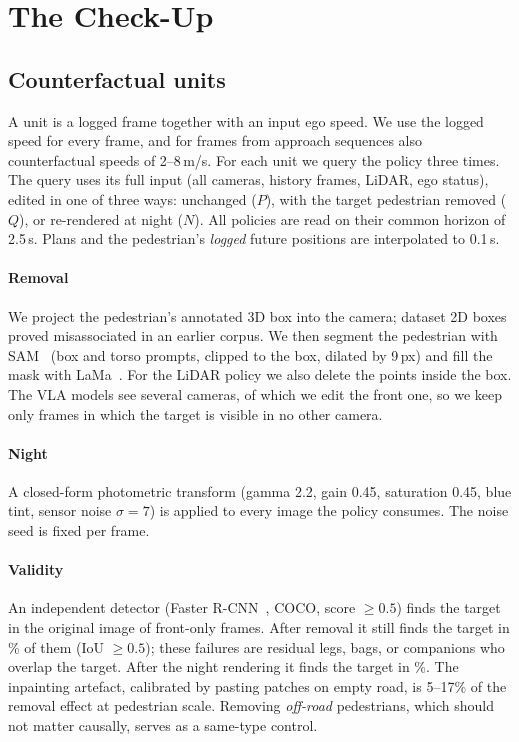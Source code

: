\section{The Check-Up}
\label{sec:checkup}



\subsection{Counterfactual units}
A unit is a logged frame together with an input ego speed. We use the logged speed for every frame,
and for frames from approach sequences also counterfactual speeds of 2--8\,m/s. For each unit we query
the policy three times. The query uses its full input (all cameras, history frames, LiDAR, ego
status), edited in one of three ways: unchanged ($P$), with the target pedestrian removed ($Q$), or
re-rendered at night ($N$). All policies are read on their common horizon of 2.5\,s. Plans and the
pedestrian's \emph{logged} future positions are interpolated to 0.1\,s.

\paragraph{Removal}
We project the pedestrian's annotated 3D box into the camera; dataset 2D boxes proved misassociated
in an earlier corpus. We then segment the pedestrian with SAM~\cite{kirillov2023sam} (box and torso
prompts, clipped to the box, dilated by 9\,px) and fill the mask with LaMa~\cite{suvorov2022lama}. For
the LiDAR policy we also delete the points inside the box. The VLA models see several cameras, of
which we edit the front one, so we keep only frames in which the target is visible in no other camera.

\paragraph{Night}
A closed-form photometric transform (gamma 2.2, gain 0.45, saturation 0.45, blue tint, sensor noise
$\sigma=7$) is applied to every image the policy consumes. The noise seed is fixed per frame.

\paragraph{Validity}
An independent detector (Faster R-CNN~\cite{ren2015faster}, COCO, score $\ge0.5$) finds the target in
the original image of \NumDetN{} front-only frames. After removal it still finds the target in
\NumDetStill\% of them (IoU $\ge0.5$); these failures are residual legs, bags, or companions who
overlap the target. After the night rendering it finds the target in \NumDetNight\%. The inpainting
artefact, calibrated by pasting patches on empty road, is 5--17\% of the removal effect at pedestrian
scale. Removing \emph{off-road} pedestrians, which should not matter causally, serves as a same-type
control.

